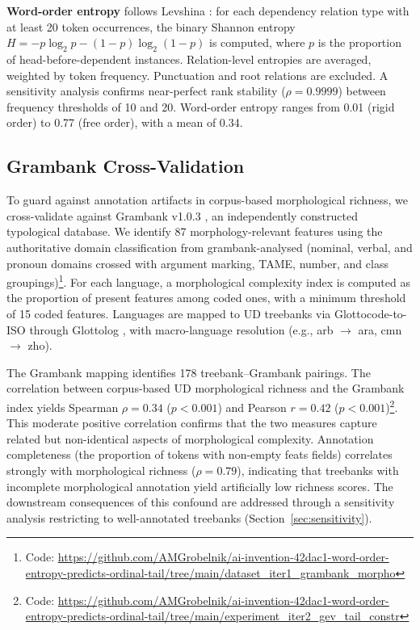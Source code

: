 \documentclass[11pt,letterpaper]{article}
\begin{document}
\textbf{Word-order entropy} follows Levshina \cite{Levshina2019}: for each dependency relation type with at least 20 token occurrences, the binary Shannon entropy $H = -p\log_2 p - (1{-}p)\log_2(1{-}p)$ is computed, where $p$ is the proportion of head-before-dependent instances. Relation-level entropies are averaged, weighted by token frequency. Punctuation and root relations are excluded. A sensitivity analysis confirms near-perfect rank stability ($\rho = 0.9999$) between frequency thresholds of 10 and 20. Word-order entropy ranges from 0.01 (rigid order) to 0.77 (free order), with a mean of 0.34.

\subsection{Grambank Cross-Validation}

To guard against annotation artifacts in corpus-based morphological richness, we cross-validate against Grambank v1.0.3 \cite{Skirgard2023}, an independently constructed typological database. We identify 87 morphology-relevant features using the authoritative domain classification from grambank-analysed (nominal, verbal, and pronoun domains crossed with argument marking, TAME, number, and class groupings)\footnote{Code: \url{https://github.com/AMGrobelnik/ai-invention-42dac1-word-order-entropy-predicts-ordinal-tail/tree/main/dataset_iter1_grambank_morpho}}. For each language, a morphological complexity index is computed as the proportion of present features among coded ones, with a minimum threshold of 15 coded features. Languages are mapped to UD treebanks via Glottocode-to-ISO through Glottolog \cite{Hammarstrom2024}, with macro-language resolution (e.g., arb $\rightarrow$ ara, cmn $\rightarrow$ zho).

The Grambank mapping identifies 178 treebank--Grambank pairings. The correlation between corpus-based UD morphological richness and the Grambank index yields Spearman $\rho = 0.34$ ($p < 0.001$) and Pearson $r = 0.42$ ($p < 0.001$)\footnote{Code: \url{https://github.com/AMGrobelnik/ai-invention-42dac1-word-order-entropy-predicts-ordinal-tail/tree/main/experiment_iter2_gev_tail_constr}}. This moderate positive correlation confirms that the two measures capture related but non-identical aspects of morphological complexity. Annotation completeness (the proportion of tokens with non-empty feats fields) correlates strongly with morphological richness ($\rho = 0.79$), indicating that treebanks with incomplete morphological annotation yield artificially low richness scores. The downstream consequences of this confound are addressed through a sensitivity analysis restricting to well-annotated treebanks (Section~\ref{sec:sensitivity}).
\end{document}
